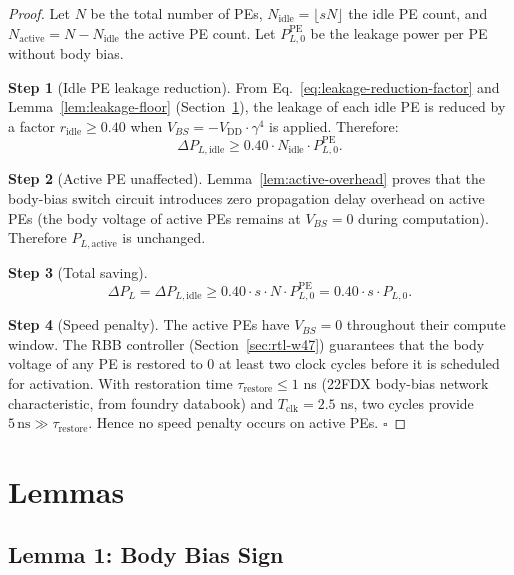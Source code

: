 \begin{proof}
Let $N$ be the total number of PEs, $N_{\mathrm{idle}} = \lfloor s N \rfloor$
the idle PE count, and $N_{\mathrm{active}} = N - N_{\mathrm{idle}}$ the
active PE count.
Let $P_{L,0}^{\mathrm{PE}}$ be the leakage power per PE without body bias.

\textbf{Step 1} (Idle PE leakage reduction).
From Eq.~\eqref{eq:leakage-reduction-factor} and Lemma~\ref{lem:leakage-floor}
(Section~\ref{sec:lemmas-w47}), the leakage of each idle PE is reduced by a
factor $r_{\mathrm{idle}} \geq 0.40$ when $V_{BS} = -V_{\mathrm{DD}} \cdot \gamma^{4}$
is applied.
Therefore:
\begin{equation}
  \Delta P_{L,\mathrm{idle}} \geq 0.40 \cdot N_{\mathrm{idle}}
    \cdot P_{L,0}^{\mathrm{PE}}.
\end{equation}

\textbf{Step 2} (Active PE unaffected).
Lemma~\ref{lem:active-overhead} proves that the body-bias switch circuit
introduces zero propagation delay overhead on active PEs (the body voltage
of active PEs remains at $V_{BS} = 0$ during computation).
Therefore $P_{L,\mathrm{active}}$ is unchanged.

\textbf{Step 3} (Total saving).
\begin{equation}
  \Delta P_L = \Delta P_{L,\mathrm{idle}} \geq 0.40 \cdot s \cdot N
    \cdot P_{L,0}^{\mathrm{PE}} = 0.40 \cdot s \cdot P_{L,0}.
\end{equation}

\textbf{Step 4} (Speed penalty).
The active PEs have $V_{BS} = 0$ throughout their compute window.
The RBB controller (Section~\ref{sec:rtl-w47}) guarantees that the body voltage
of any PE is restored to 0 at least two clock cycles before it is scheduled
for activation.
With restoration time $\tau_{\mathrm{restore}} \leq 1$ ns (22FDX body-bias
network characteristic, from foundry databook) and $T_{\mathrm{clk}} = 2.5$ ns,
two cycles provide $5\,\text{ns} \gg \tau_{\mathrm{restore}}$.
Hence no speed penalty occurs on active PEs. $\square$
\end{proof}

\section{Lemmas}
\label{sec:lemmas-w47}

\subsection{Lemma 1: Body Bias Sign}
\label{lem:body-bias-sign}

